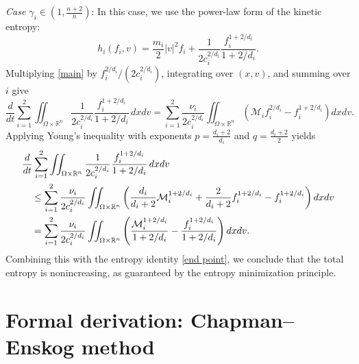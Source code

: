 \documentclass[10pt,reqno]{amsart}
\numberwithin{equation}{section}
\newcommand{\R}{\mathbb R}
\begin{document}
\begin{enumerate}[label=(\roman*)]
\emph{Case $\gamma_i \in \left(1, \frac{n+2}{n} \right)$}: In this case, we use the power-law form of the kinetic entropy:
	\[
	h_i(f_i,v) = \frac{m_i}{2} |v|^2 f_i + \frac{1}{2c_i^{2/d_i}} \frac{f_i^{1+2/d_i}}{1+2/d_i}.
	\]
	Multiplying \eqref{main} by $f_i^{2/d_i}/(2c_i^{2/d_i})$, integrating over $(x,v)$, and summing over $i$ give
\[
\frac{d}{dt} \sum_{i=1}^2 \iint_{\Omega \times \mathbb{R}^n} \frac{1}{2c_i^{2/d_i}} \frac{f_i^{1+2/d_i}}{1+2/d_i} 
\,dxdv = \sum_{i=1}^2 \frac{\nu_i}{2c_i^{2/d_i}} \iint_{\Omega \times \mathbb{R}^n} \left( \mathcal{M}_i f_i^{2/d_i} - f_i^{1+2/d_i} \right) dx dv.
\]
Applying Young's inequality with exponents $p = \frac{d_i + 2}{d_i}$ and $q = \frac{d_i + 2}{2}$ yields
\begin{align*}
&\frac{d}{dt} \sum_{i=1}^2 \iint_{\Omega \times \R^n} \frac{1}{2c_i^{2/d_i}} \frac{f_i^{1+2/d_i}}{1+2/d_i}\,dxdv\cr
&\quad \le \sum_{i=1}^2 \frac{\nu_i}{2c_i^{2/d_i}} \iint_{\Omega \times \R^n} \left( \frac{d_i}{d_i+2} \mathcal{M}_i^{1+2/d_i} + \frac{2}{d_i+2} f_i^{1+2/d_i} - f_i^{1+2/d_i} \right) dx dv \\
&\quad = \sum_{i=1}^2 \frac{\nu_i}{2c_i^{2/d_i}} \iint_{\Omega \times \R^n} \left( \frac{\mathcal{M}_i^{1+2/d_i}}{1+2/d_i} - \frac{f_i^{1+2/d_i}}{1+2/d_i} \right) dx dv.
\end{align*}
Combining this with the entropy identity \eqref{end point}, we conclude that the total entropy is nonincreasing, as guaranteed by the entropy minimization principle.
\end{enumerate}

\section{Formal derivation: Chapman--Enskog method}\label{sec_ce}
\end{document}
